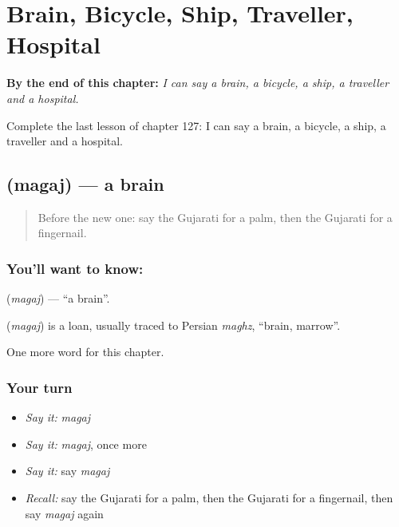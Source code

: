 
\chapter{Brain, Bicycle, Ship, Traveller, Hospital}
\label{ch:gu-brain-bicycle-ship-traveller-hospital}

\begin{chapteropening}
\textbf{By the end of this chapter:} \emph{I can say a brain, a bicycle, a ship, a traveller and a hospital.}

Complete the last lesson of chapter 127: I can say a brain, a bicycle, a ship, a traveller and a hospital.
\end{chapteropening}

\section[\texorpdfstring{\gu{મગજ} (magaj)}{મગજ (magaj)}]{ (magaj) — a brain}

\label{lesson:GU-C127-magaj}



\begin{quote}
Before the new one: say the Gujarati for a palm, then the Gujarati for a fingernail.
\end{quote}

\subsection*{You'll want to know: }
\textbf{} (\emph{magaj}) — \textquotedblleft{}a brain\textquotedblright{}.

\begin{cousinweb}
\textbf{} (\emph{magaj}) is a loan, usually traced to Persian \emph{maghz}, \textquotedblleft{}brain, marrow\textquotedblright{}.
\end{cousinweb}

\begin{grammarlens}[title={What you've built}]
One more word for this chapter.
\end{grammarlens}

\subsection*{Your turn}
\begin{itemize}
\raggedright
  \item \emph{Say it:} \emph{magaj}
  \item \emph{Say it:} \emph{magaj}, once more
  \item \emph{Say it:} say \emph{magaj}
  \item \emph{Recall:} say the Gujarati for a palm, then the Gujarati for a fingernail, then say \emph{magaj} again
\end{itemize}

